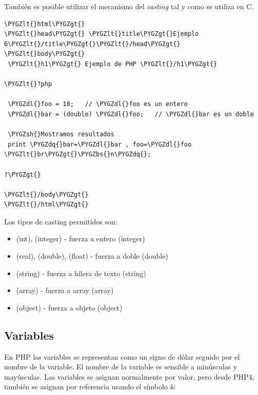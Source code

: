 \documentclass[a5paper,10pt,spanish]{sphinxmanual}
\def\PYGZbs{\char`\\}
\def\PYGZlt{\char`\<}
\def\PYGZgt{\char`\>}
\def\PYGZsh{\char`\#}
\def\PYGZdl{\char`\$}
\def\PYGZdq{\char`\"}
\begin{document}
También es posible utilizar el mecanismo del \emph{casting} tal y como se
utiliza en C.

\begin{Verbatim}[commandchars=\\\{\}]
\PYGZlt{}html\PYGZgt{}
\PYGZlt{}head\PYGZgt{} \PYGZlt{}title\PYGZgt{}Ejemplo 6\PYGZlt{}/title\PYGZgt{}\PYGZlt{}/head\PYGZgt{}
\PYGZlt{}body\PYGZgt{}
 \PYGZlt{}h1\PYGZgt{} Ejemplo de PHP \PYGZlt{}/h1\PYGZgt{}

\PYGZlt{}?php

 \PYGZdl{}foo = 10;   // \PYGZdl{}foo es un entero
 \PYGZdl{}bar = (double) \PYGZdl{}foo;   // \PYGZdl{}bar es un doble

 \PYGZsh{}Mostramos resultados
 print \PYGZdq{}bar=\PYGZdl{}bar , foo=\PYGZdl{}foo \PYGZlt{}br\PYGZgt{}\PYGZbs{}n\PYGZdq{};

?\PYGZgt{}

\PYGZlt{}/body\PYGZgt{}
\PYGZlt{}/html\PYGZgt{}
\end{Verbatim}

Los tipos de casting permitidos son:
\begin{itemize}
\item {} 
(int), (integer) - fuerza a entero (integer)

\item {} 
(real), (double), (float) - fuerza a doble (double)

\item {} 
(string) - fuerza a hilera de texto (string)

\item {} 
(array) - fuerza a array (array)

\item {} 
(object) - fuerza a objeto (object)

\end{itemize}


\subsection{Variables}
\label{Tutorial1_Conceptos.md:variables}
En PHP las variables se representan como un signo de dólar seguido por
el nombre de la variable. El nombre de la variable es sensible a
minúsculas y mayúsculas. Las variables se asignan normalmente por valor,
pero desde PHP4, también se asignan por referencia usando el símbolo \&
\end{document}
